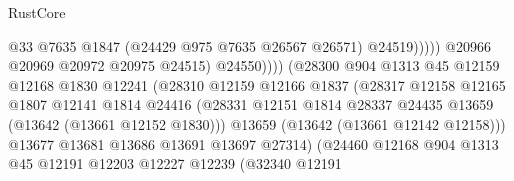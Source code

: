 \begin{lexlean}{RustCore}
\begin{coremodule}
                                                    @33
                                                    @7635
                                                    @1847
                                                    (@24429 @975 @7635 @26567 @26571)
                                                    @24519)))))
                                          @20966
                                          @20969
                                          @20972
                                          @20975
                                          @24515)
                                        @24550))))
                                (@28300
                                  @904
                                  @1313
                                  @45
                                  @12159
                                  @12168
                                  @1830
                                  @12241
                                  (@28310
                                    @12159
                                    @12166
                                    @1837
                                    (@28317
                                      @12158
                                      @12165
                                      @1807
                                      @12141
                                      @1814
                                      @24416
                                      (@28331
                                        @12151
                                        @1814
                                        @28337
                                        @24435
                                        @13659
                                        (@13642 (@13661 @12152 @1830)))
                                      @13659
                                      (@13642 (@13661 @12142 @12158)))
                                    @13677
                                    @13681
                                    @13686
                                    @13691
                                    @13697
                                    @27314)
                                  (@24460
                                    @12168
                                    @904
                                    @1313
                                    @45
                                    @12191
                                    @12203
                                    @12227
                                    @12239
                                    (@32340
                                      @12191

\end{coremodule}
\end{lexlean}
